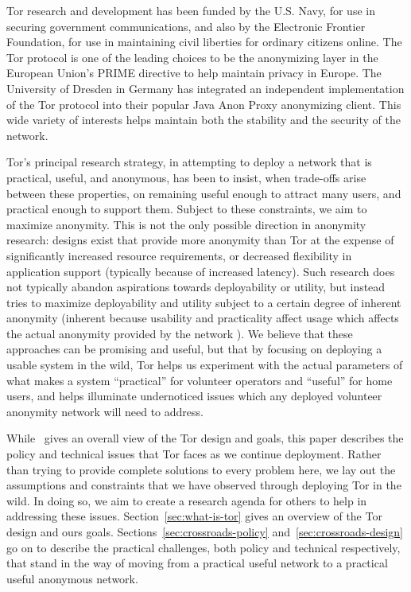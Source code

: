 \documentclass{llncs}
\begin{document}
Tor research and development has been funded by the U.S. Navy, for use
in securing government
communications, and also by the Electronic Frontier Foundation, for use
in maintaining civil liberties for ordinary citizens online. The Tor
protocol is one of the leading choices
to be the anonymizing layer in the European Union's PRIME directive to
help maintain privacy in Europe. The University of Dresden in Germany
has integrated an independent implementation of the Tor protocol into
their popular Java Anon Proxy anonymizing client. This wide variety of
interests helps maintain both the stability and the security of the
network.

Tor's principal research strategy, in attempting to deploy a network that is
practical, useful, and anonymous, has been to insist, when trade-offs arise
between these properties, on remaining useful enough to attract many users,
and practical enough to support them.  Subject to these
constraints, we aim to maximize anonymity.  This is not the only possible
direction in anonymity research: designs exist that provide more anonymity
than Tor at the expense of significantly increased resource requirements, or
decreased flexibility in application support (typically because of increased
latency).  Such research does not typically abandon aspirations towards
deployability or utility, but instead tries to maximize deployability and
utility subject to a certain degree of inherent anonymity (inherent because
usability and practicality affect usage which affects the actual anonymity
provided by the network \cite{back01,econymics}). We believe that these
approaches can be promising and useful, but that by focusing on deploying a
usable system in the wild, Tor helps us experiment with the actual parameters
of what makes a system ``practical'' for volunteer operators and ``useful''
for home users, and helps illuminate undernoticed issues which any deployed
volunteer anonymity network will need to address. 

While~\cite{tor-design} gives an overall view of the Tor design and goals,
this paper describes the policy and technical issues that Tor faces as
we continue deployment. Rather than trying to provide complete solutions
to every problem here, we lay out the assumptions and constraints
that we have observed through deploying Tor in the wild. In doing so, we
aim to create a research agenda for others to
help in addressing these issues. Section~\ref{sec:what-is-tor} gives an
overview of the Tor
design and ours goals. Sections~\ref{sec:crossroads-policy}
and~\ref{sec:crossroads-design} go on to describe the practical challenges,
both policy and technical respectively, that stand in the way of moving
from a practical useful network to a practical useful anonymous network.
\end{document}
